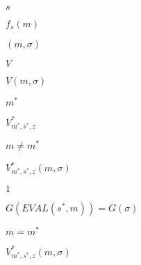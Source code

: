 \documentclass[10pt]{book}
\begin{document}
\begin{mdSnippets}
\begin{mdInlineSnippet}[03c7c0ace395d80182db07ae2c30f034]%
$s$\end{mdInlineSnippet}%
\begin{mdInlineSnippet}%
$f_s(m)$\end{mdInlineSnippet}%
\begin{mdInlineSnippet}[39408ea26845b8587120e147802b8568]%
$(m,\sigma)$\end{mdInlineSnippet}%
\begin{mdInlineSnippet}[5206560a306a2e085a437fd258eb57ce]%
$V$\end{mdInlineSnippet}%
\begin{mdInlineSnippet}[18f6a0ccf7e706e13d6a92687ff2e7e1]%
$V(m,\sigma)$\end{mdInlineSnippet}%
\begin{mdInlineSnippet}%
$m^*$\end{mdInlineSnippet}%
\begin{mdInlineSnippet}[5c3951032cae6c39da94a788bc286b1e]%
$V^*_{m^*,s^*,z}$\end{mdInlineSnippet}%
\begin{mdInlineSnippet}%
$m\neq m^*$\end{mdInlineSnippet}%
\begin{mdInlineSnippet}[0da5e13eb4b9a591ac9cda85af070b85]%
$V^*_{m^*,s^*,z}(m,\sigma)$\end{mdInlineSnippet}%
\begin{mdInlineSnippet}[c4ca4238a0b923820dcc509a6f75849b]%
$1$\end{mdInlineSnippet}%
\begin{mdInlineSnippet}[19ad8c8c3bcc3408b4e90b6750497652]%
$G(EVAL(s^*,m))=G(\sigma)$\end{mdInlineSnippet}%
\begin{mdInlineSnippet}%
$m=m^*$\end{mdInlineSnippet}%
\begin{mdInlineSnippet}[0da5e13eb4b9a591ac9cda85af070b85]%
$V^*_{m^*,s^*,z}(m,\sigma)$\end{mdInlineSnippet}%

\end{mdSnippets}
\end{document}
